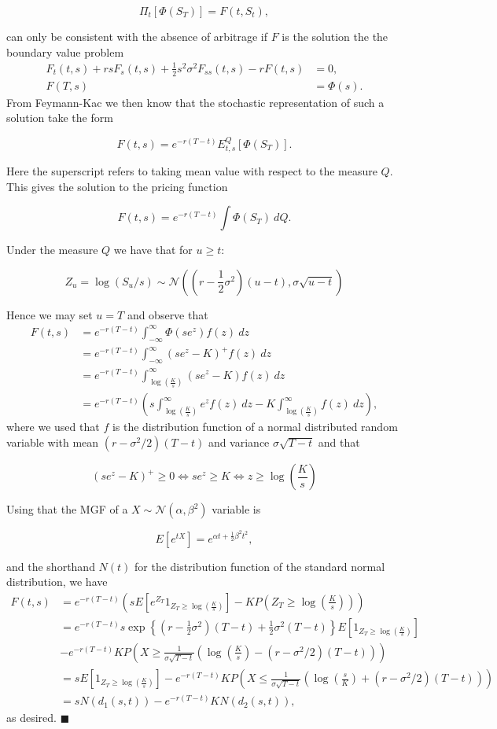 \documentclass[
]{book}
\begin{document}
\[
\Pi_t[\Phi(S_T)]=F(t,S_t),
\]

can only be consistent with the absence of arbitrage if \(F\) is the solution the the boundary value problem
\begin{align*}
F_t(t,s)+rsF_s(t,s)+\frac{1}{2}s^2\sigma^2F_{ss}(t,s)-rF(t,s)&=0,\\
F(T,s)&=\Phi(s).
\end{align*}
From Feymann-Kac we then know that the stochastic representation of such a solution take the form

\[
F(t,s)=e^{-r(T-t)}E_{t,s}^Q[\Phi(S_T)].
\]

Here the superscript refers to taking mean value with respect to the measure \(Q\). This gives the solution to the pricing function

\[
F(t,s)=e^{-r(T-t)}\int \Phi(S_T)\ dQ.
\]

Under the measure \(Q\) we have that for \(u\ge t\):

\[
Z_u=\log (S_u/s)\sim \mathcal{N}\left(\left(r-\frac{1}{2}\sigma^2\right)(u-t),\sigma\sqrt{u-t}\right)
\]

Hence we may set \(u=T\) and observe that
\begin{align*}
F(t,s)&=e^{-r(T-t)}\int_{-\infty}^\infty \Phi(se^z) f(z)\ dz\\
&=e^{-r(T-t)}\int_{-\infty}^\infty (se^z-K)^+ f(z)\ dz\\
&=e^{-r(T-t)}\int_{\log\left(\frac{K}{s}\right)}^{\infty} (se^z-K) f(z)\ dz\\
&=e^{-r(T-t)}\left(s\int_{\log\left(\frac{K}{s}\right)}^{\infty} e^z f(z)\ dz-K\int_{\log\left(\frac{K}{s}\right)}^{\infty} f(z)\ dz\right),
\end{align*}
where we used that \(f\) is the distribution function of a normal distributed random variable with mean \((r-\sigma^2/2)(T-t)\) and variance \(\sigma\sqrt{T-t}\) and that

\[
(se^z-K)^+ \ge 0\iff se^z\ge K\iff z\ge \log\left(\frac{K}{s}\right)
\]

Using that the MGF of a \(X\sim\mathcal{N}(\alpha, \beta^2)\) variable is

\[
E[e^{tX}]=e^{\alpha t+\frac{1}{2}\beta ^2t^2},
\]

and the shorthand \(N(t)\) for the distribution function of the standard normal distribution, we have
\begin{align*}
F(t,s)&=e^{-r(T-t)}\left(sE\left[e^{Z_T}1_{Z_T\ge \log\left(\frac{K}{s}\right)}\right]-K P\left(Z_T\ge \log\left(\frac{K}{s}\right)\right)\right)\\
&=e^{-r(T-t)}s\exp\left\{\left(r-\frac{1}{2}\sigma^2\right)(T-t)+\frac{1}{2}\sigma^2(T-t)\right\}E\left[1_{Z_T\ge \log\left(\frac{K}{s}\right)}\right]\\
&-e^{-r(T-t)}K P\left(X\ge\frac{1}{\sigma\sqrt{T-t}}\left( \log\left(\frac{K}{s}\right)-(r-\sigma^2/2)(T-t)\right)\right)\\
&=sE\left[1_{Z_T\ge \log\left(\frac{K}{s}\right)}\right]-e^{-r(T-t)}K P\left(X\le\frac{1}{\sigma\sqrt{T-t}}\left(\log\left(\frac{s}{K}\right)+(r-\sigma^2/2)(T-t)\right)\right)\\
&=sN(d_1(s,t))-e^{-r(T-t)}K N\left(d_2(s,t)\right),
\end{align*}
as desired. \(\blacksquare\)
\end{document}
